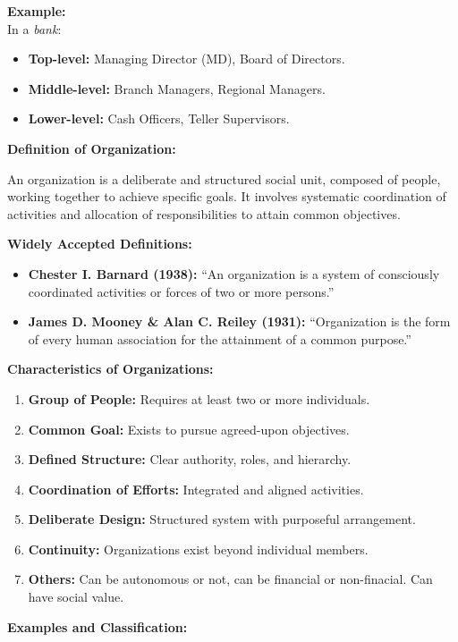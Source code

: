 \documentclass[12pt,a4paper]{book}
\begin{document}
\textbf{Example:}\\
In a \textit{bank}:
\begin{itemize}
    \item \textbf{Top-level:} Managing Director (MD), Board of Directors.
    \item \textbf{Middle-level:} Branch Managers, Regional Managers.
    \item \textbf{Lower-level:} Cash Officers, Teller Supervisors.
\end{itemize}


\textbf{Definition of Organization:}

An organization is a deliberate and structured social unit, composed of people, working together to achieve specific goals. It involves systematic coordination of activities and allocation of responsibilities to attain common objectives.

\textbf{Widely Accepted Definitions:}
\begin{itemize}
    \item \textbf{Chester I. Barnard (1938):} ``An organization is a system of consciously coordinated activities or forces of two or more persons.''
    \item \textbf{James D. Mooney \& Alan C. Reiley (1931):} ``Organization is the form of every human association for the attainment of a common purpose.''
\end{itemize}

\textbf{Characteristics of Organizations:}
\begin{enumerate}
    \item \textbf{Group of People:} Requires at least two or more individuals.
    \item \textbf{Common Goal:} Exists to pursue agreed-upon objectives.
    \item \textbf{Defined Structure:} Clear authority, roles, and hierarchy.
    \item \textbf{Coordination of Efforts:} Integrated and aligned activities.
    \item \textbf{Deliberate Design:} Structured system with purposeful arrangement.
    \item \textbf{Continuity:} Organizations exist beyond individual members.
    \item \textbf{Others:} Can be autonomous or not, can be financial or non-finacial. Can have social value.
\end{enumerate}

\textbf{Examples and Classification:}
\end{document}
